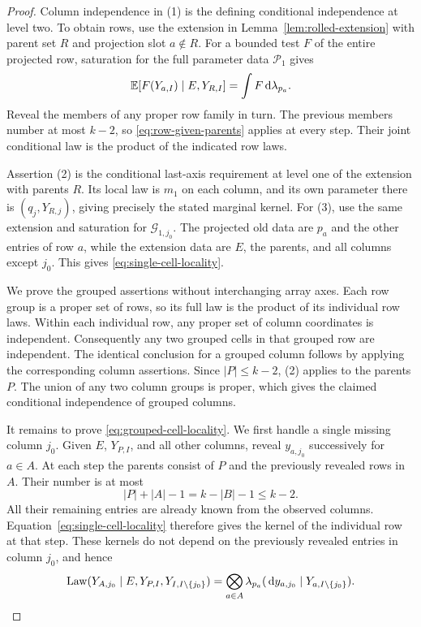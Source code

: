 \begin{proof}
Column independence in (1) is the defining conditional independence at
level two.  To obtain rows, use the extension in
Lemma~\ref{lem:rolled-extension} with parent set $R$ and projection
slot $a\notin R$.  For a bounded test $F$ of the entire projected row,
saturation for the full parameter data $\mathcal P_1$ gives
\begin{equation}\label{eq:row-given-parents}
 \mathbb E[F(Y_{a,I})\mid E,Y_{R,I}]
 =\int F\,\mathrm d\lambda_{p_a}.
\end{equation}
Reveal the members of any proper row family in turn.  The previous
members number at most $k-2$, so \eqref{eq:row-given-parents} applies
at every step.  Their joint conditional law is the product of the
indicated row laws.

Assertion (2) is the conditional last-axis requirement at level one of
the extension with parents $R$.  Its local law is $m_1$ on each column,
and its own parameter there is $(q_j,Y_{R,j})$, giving precisely the
stated marginal kernel.  For (3), use the same extension and saturation
for $\mathcal G_{1,j_0}$.  The projected old data are $p_a$ and the
other entries of row $a$, while the extension data are $E$, the parents,
and all columns except $j_0$.  This gives
\eqref{eq:single-cell-locality}.

We prove the grouped assertions without interchanging array axes.
Each row group is a proper set of rows, so its full law is the product
of its individual row laws.  Within each individual row, any proper
set of column coordinates is independent.  Consequently any two
grouped cells in that grouped row are independent.  The identical
conclusion for a grouped column follows by applying the corresponding
column assertions.  Since $|P|\leq k-2$, (2) applies to the parents
$P$.  The union of any two column groups is proper, which gives the
claimed conditional independence of grouped columns.

It remains to prove \eqref{eq:grouped-cell-locality}.  We first handle
a single missing column $j_0$.  Given $E$, $Y_{P,I}$, and all other
columns, reveal $y_{a,j_0}$ successively for $a\in A$.  At each step
the parents consist of $P$ and the previously revealed rows in $A$.
Their number is at most
\[
 |P|+|A|-1=k-|B|-1\leq k-2.
\]
All their remaining entries are already known from the observed
columns.  Equation~\eqref{eq:single-cell-locality} therefore gives
the kernel of the individual row at that step.  These kernels do not
depend on the previously revealed entries in column $j_0$, and hence
\begin{equation}\label{eq:group-single-missing}
 \operatorname{Law}(Y_{A,j_0}\mid E,Y_{P,I},Y_{I,I\setminus\{j_0\}})
 =\bigotimes_{a\in A}
   \lambda_{p_a}(\,\mathrm d y_{a,j_0}\mid Y_{a,I\setminus\{j_0\}}).
\end{equation}


\end{proof}
